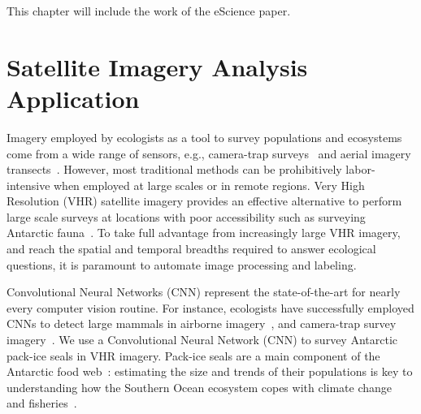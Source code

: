 \label{designs}

This chapter will include the work of the eScience paper.

\section{Satellite Imagery Analysis Application}\label{sec:ucase}
Imagery employed by ecologists as a tool to survey populations and ecosystems come from a wide range of sensors, e.g., camera-trap surveys~\cite{karanth1995estimating} and aerial imagery transects~\cite{western2009impact}.
However, most traditional methods can be prohibitively labor-intensive when employed at large scales or in remote regions.
Very High Resolution (VHR) satellite imagery provides an effective alternative to perform large scale surveys at locations with poor accessibility such as surveying Antarctic fauna~\cite{lynch2012detection}.
To take full advantage from increasingly large VHR imagery, and reach the spatial and temporal breadths required to answer ecological questions, it is paramount to automate image processing and labeling.


Convolutional Neural Networks (CNN) represent the state-of-the-art for nearly every computer vision routine.
For instance, ecologists have successfully employed CNNs to detect large mammals in airborne imagery~\cite{kellenberger2018detecting,polzounov2016right}, and camera-trap survey imagery~\cite{norouzzadeh2018automatically}.
We use a Convolutional Neural Network (CNN) to survey Antarctic pack-ice seals in VHR imagery.
Pack-ice seals are a main component of the Antarctic food web~\cite{fabra2008convention}: estimating the size and trends of their populations is key to understanding how the Southern Ocean ecosystem copes with climate change~\cite{hillebrand2018climate} and fisheries~\cite{reid2019climate}.

